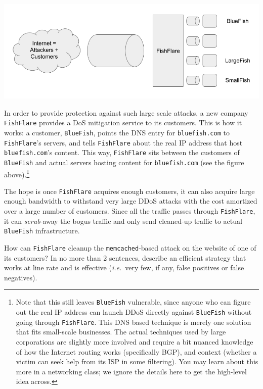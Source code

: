 \documentclass[12pt]{exam}
\newcommand{\solbox}[2]{%
\fbox{%
\parbox[c][#1][t]{\dimexpr\linewidth-2\fboxsep-2\fboxrule}{
  \hrule width \hsize height 0pt
  #2
 }%
}%
\par\vspace{\ht\strutbox}
}
\newcommand{\textfield}[3]{%
\iftoggle{pdfform}{%
\TextField[name = #1, backgroundcolor=white, height=#2,
width = \linewidth, multiline=true]{\mbox}%
}{%
\ifprintanswers\else{%
    \solbox{#2}{#3}}
\fi%
}%
}
\begin{document}
\begin{Form}
\begin{questions}
\begin{parts}
\includegraphics[scale=0.5]{FishFlare}

In order to provide protection against such large scale attacks, a new company
\texttt{FishFlare} provides a DoS mitigation service to its customers. This is
how it works: a customer, \texttt{BlueFish}, points the DNS entry for
\texttt{bluefish.com} to \texttt{FishFlare}'s servers, and tells
\texttt{FishFlare} about the real IP address that host \texttt{bluefish.com}'s
content. This way, \texttt{FishFlare} sits between the customers of
\texttt{BlueFish} and actual servers hosting content for \texttt{bluefish.com}
(see the figure above).\footnote{Note that this still leaves
\texttt{BlueFish} vulnerable, since anyone who can figure out the real IP
address can launch DDoS directly against \texttt{BlueFish} without going through
\texttt{FishFlare}. This DNS based technique is merely one solution that fits
small-scale businesses. The actual techniques used by large corporations are
slightly more involved and require a bit nuanced knowledge of how the Internet
routing works (specifically BGP), and context (whether a victim can seek help
from its ISP in some filtering). You may learn about this more in a networking
class; we ignore the details here to get the high-level idea across.}

The hope is once \texttt{FishFlare} acquires enough customers, it can also
acquire large enough bandwidth to withstand very large DDoS attacks with the
cost amortized over a large number of customers. Since all the traffic passes
through \texttt{FishFlare}, it can \emph{scrub}-away the bogus traffic and only
send cleaned-up traffic to actual \texttt{BlueFish} infrastructure.

How can \texttt{FishFlare} cleanup the \texttt{memcached}-based attack on the 
website of one of its customers? In no more than 2 sentences, describe an 
efficient strategy that works at line rate and is effective (\emph{i.e.}\ very
few, if any, false positives or false negatives).


\textfield{Q4P4}{3cm}{
Block all inbound UDP packets from source port 11211.
}


\end{parts}
\end{questions}
\end{Form}
\end{document}
